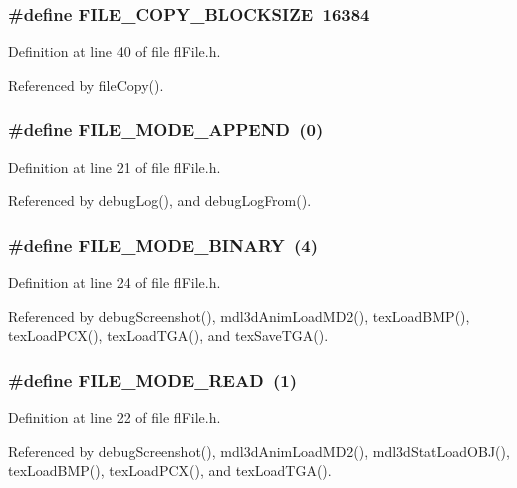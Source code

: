 \subsubsection{\setlength{\rightskip}{0pt plus 5cm}\#define FILE\_\-COPY\_\-BLOCKSIZE~16384}\label{flFile_8h_992a9b120a1bd17d0fef8b7e9b6b3a7c}




Definition at line 40 of file fl\-File.h.

Referenced by file\-Copy().
\subsubsection{\setlength{\rightskip}{0pt plus 5cm}\#define FILE\_\-MODE\_\-APPEND~(0)}\label{flFile_8h_7f2e51c33faea832061aa194a761dc2b}




Definition at line 21 of file fl\-File.h.

Referenced by debug\-Log(), and debug\-Log\-From().
\subsubsection{\setlength{\rightskip}{0pt plus 5cm}\#define FILE\_\-MODE\_\-BINARY~(4)}\label{flFile_8h_0f396696b14f2798b74cab1408c7f554}




Definition at line 24 of file fl\-File.h.

Referenced by debug\-Screenshot(), mdl3d\-Anim\-Load\-MD2(), tex\-Load\-BMP(), tex\-Load\-PCX(), tex\-Load\-TGA(), and tex\-Save\-TGA().
\subsubsection{\setlength{\rightskip}{0pt plus 5cm}\#define FILE\_\-MODE\_\-READ~(1)}\label{flFile_8h_01a82af4b478b1d490bf495e26c319d8}




Definition at line 22 of file fl\-File.h.

Referenced by debug\-Screenshot(), mdl3d\-Anim\-Load\-MD2(), mdl3d\-Stat\-Load\-OBJ(), tex\-Load\-BMP(), tex\-Load\-PCX(), and tex\-Load\-TGA().
